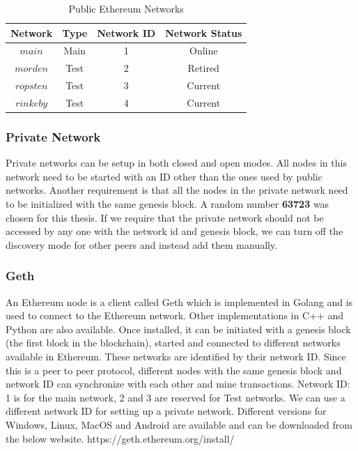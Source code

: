 \documentclass[11pt,openright]{report}
\begin{document}
\begin{table}[!htbp]
	\renewcommand{\arraystretch}{1.3}
	\caption{Public Ethereum Networks}
	\label{pub_eth_networks}
	\centering
	\begin{tabular}{|c||c|c|c|}
		\hline
		\bfseries Network & \bfseries Type & \bfseries Network ID & \bfseries Network Status \\
		\hline\hline
		$main$ & Main & 1 & Online \\ \hline
		$morden$ & Test & 2 & Retired \\ \hline
		$ropsten$ & Test & 3 & Current \\ \hline
		$rinkeby$ & Test & 4 & Current \\ \hline

	\end{tabular}
\end{table}

\subsubsection{Private Network}
Private networks can be setup in both closed and open modes. All nodes in this network need to be started with an ID other than the ones used by public networks. Another requirement is that all the nodes in the private network need to be initialized with the same genesis block. A random number \textbf{63723} was chosen for this thesis. If we require that the private network should not be accessed by any one with the network id and genesis block, we can turn off the discovery mode for other peers and instead add them manually.

\subsubsection{Geth}
An Ethereum node is a client called Geth which is implemented in Golang and is used to connect to the Ethereum network. Other implementations in C++ and Python are also available. Once installed, it can be initiated with a genesis block (the first block in the blockchain), started and connected to different networks available in Ethereum. These networks are identified by their network ID. Since this is a peer to peer protocol, different nodes with the same genesis block and network ID can synchronize with each other and mine transactions. Network ID: 1 is for the main network, 2 and 3 are reserved for Test networks. We can use a different network ID for setting up a private network. Different versions for Windows, Linux, MacOS and Android are available and can be downloaded from the below website.
https://geth.ethereum.org/install/
\end{document}
